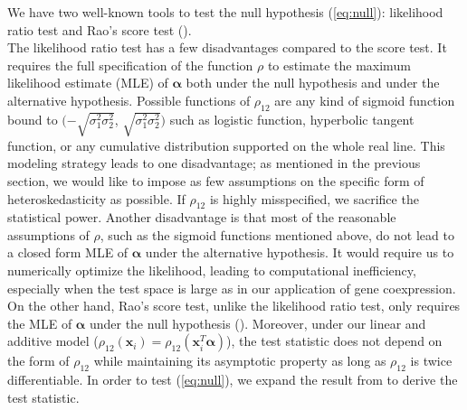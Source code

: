 \documentclass[aap,authoryear, preprint]{imsart}
\numberwithin{equation}{section}
\theoremstyle{plain}
\begin{document}
We have two well-known tools to test the null hypothesis (\ref{eq:null}): likelihood ratio test and Rao's score test (\cite{breusch1979simple}). \\

The likelihood ratio test has a few disadvantages compared to the score test. It requires the full specification of the function $\rho$ to estimate the maximum likelihood estimate (MLE) of $\bm{\alpha}$ both under the null hypothesis and under the alternative hypothesis. Possible functions of $\rho_{12}$ are any kind of sigmoid function bound to $(-\sqrt{\sigma_1^2\sigma_2^2}$, $\sqrt{\sigma_1^2\sigma_2^2})$ such as logistic function, hyperbolic tangent function, or any cumulative distribution supported on the whole real line. This modeling strategy leads to one disadvantage; as mentioned in the previous section, we would like to impose as few assumptions on the specific form of heteroskedasticity as possible. If $\rho_{12}$ is highly misspecified, we sacrifice the statistical power. Another disadvantage is that most of the reasonable assumptions of $\rho$, such as the sigmoid functions mentioned above, do not lead to a closed form MLE of $\bm{\alpha}$ under the alternative hypothesis. It would require us to numerically optimize the likelihood, leading to computational inefficiency, especially when the test space is large as in our application of gene coexpression. \\

On the other hand, Rao's score test, unlike the likelihood ratio test, only requires the MLE of $\bm{\alpha}$ under the null hypothesis (\cite{rao1973linear}). Moreover, under our linear and additive model ($\rho_{12}(\bm{x}_i) = \rho_{12}(\bm{x}_i^T\bm{\alpha})$), the test statistic does not depend on the form of $\rho_{12}$ while maintaining its asymptotic property as long as $\rho_{12}$ is twice differentiable. In order to test (\ref{eq:null}), we expand the result from \cite{breusch1979simple} to derive the test statistic.\\ 
\end{document}
